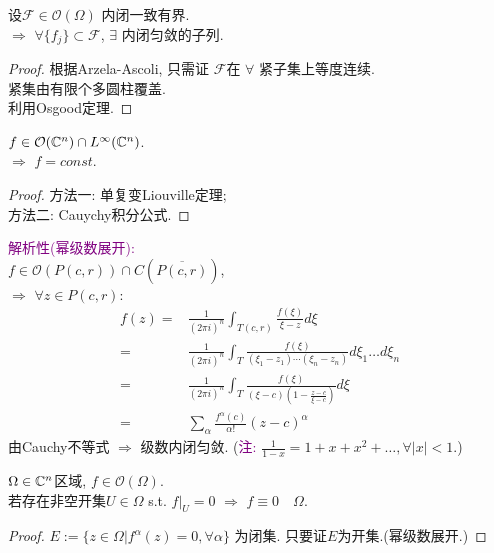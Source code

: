 \begin{theorem}[Montel]
  设$\mathcal{F} \in \mathcal{O}(\Omega )$ 内闭一致有界.\\
  $\Rightarrow $ $\forall \{f_j\} \subset \mathcal{F}$, $\exists$ 内闭匀敛的子列.   
\end{theorem}
\begin{proof}
  根据Arzela-Ascoli, 只需证 $\mathcal{F}$在 $\forall$ 紧子集上等度连续.\\
  紧集由有限个多圆柱覆盖.\\
利用Osgood定理.
\end{proof}

\begin{theorem}[Liouville]
    $f \in \mathcal{O}({\mathbb C}^n) \cap L^{\infty }({\mathbb C}^n)$.\\
    $\Rightarrow $ $f=const.$   
\end{theorem}
\begin{proof}
 方法一: 单复变Liouville定理;\\
  方法二: Cauychy积分公式.
\end{proof}

\noindent \textcolor{purple}{解析性(幂级数展开):}\\
$f \in \mathcal{O}(P(c,r))\cap C(\overline{P(c,r)})$,\\
$\Rightarrow $ $\forall z \in P(c,r)$:
\begin{equation*}
  \begin{aligned}
    f(z)=& \frac{1}{(2 \pi i)^n} \int_{T(c,r)} \frac{f(\xi )}{\xi -z} d \xi \\
    =& \frac{1}{(2 \pi i)^n} \int_{T} \frac{f(\xi )}{(\xi_1 -z_1) \cdots (\xi_n -z_n)} d \xi_1 \dots d\xi_n\\
    =& \frac{1}{(2 \pi i)^n} \int_{T} \frac{f(\xi )}{(\xi -c)\left(1-\frac{z-c}{\xi -c}\right)} d \xi\\
    =& \sum_{\alpha } \frac{f^\alpha (c)}{\alpha !}(z-c)^\alpha 
  \end{aligned} 
\end{equation*}   
由Cauchy不等式 $\Rightarrow $ 级数内闭匀敛. (\textcolor{purple}{注:} $\frac{1}{1-x}=1+x+x^2+\dots, \forall |x| <1 .$)

\begin{theorem}[唯一性]
    $\Omega \in {\mathbb C}^n$区域, $f \in \mathcal{O}(\Omega )$.\\
    若存在非空开集$U \in \Omega $ s.t. $f|_U=0$ $\Rightarrow $ $f \equiv 0 \quad \Omega .$  
\end{theorem}
\begin{proof}
  $E:=\{z \in \Omega | f^{\alpha }(z)=0, \forall \alpha \}$ 为闭集. 只要证$E$为开集.(幂级数展开.) 
\end{proof}


